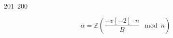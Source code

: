 201~200~\documentclass{article}
\begin{document}
\begin{enumerate}
	                                                                        	                                                                    	                                	                    	                    	                        	                        	                    	                                                                	                	                                                                    \[
	                                                                        	                                                                    	                                	                    	                    	                        	                        	                    	                                                                	                	                                                                    	\alpha = \mathbb{Z} \left( \frac{-v[-2] \cdot n}{B} \mod n \right)
	                                                                        	                                                                    	                                	                    	                    	                        	                        	                    	                                                                	                	                                                                    	\]


\end{enumerate}
\end{document}
